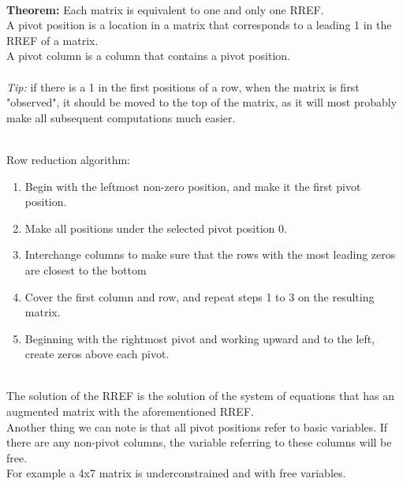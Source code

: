 \documentclass[nobib]{tufte-handout}
\begin{document}
\vspace{0.2cm}\\
\textbf{Theorem:} Each matrix is equivalent to one and only one RREF.\\
\quad A pivot position is a location in a matrix that corresponds to a leading 1 in the RREF of a matrix.\\
\quad A pivot column is a column that contains a pivot position.\\~\\
\textit{Tip:} if there is a 1 in the first positions of a row, when the matrix is first "observed", it should be moved to the top of the matrix, as it will most probably make all subsequent computations much easier. \\~\\
\begin{minipage}{\textwidth}
    Row reduction algorithm:
    \begin{enumerate}
        \item Begin with the leftmost non-zero position, and make it the first pivot
              position.
        \item Make all positions under the selected pivot position 0.
        \item Interchange columns to make sure that the rows with the most leading zeros are
              closest to the bottom
        \item Cover the first column and row, and repeat steps 1 to 3 on the resulting
              matrix.
        \item Beginning with the rightmost pivot and working upward and to the left, create
              zeros above each pivot.
    \end{enumerate}
\end{minipage}
\vspace{0.2cm}\\
The solution of the RREF is the solution of the system of equations that has an augmented matrix with the aforementioned RREF.\\
\quad Another thing we can note is that all pivot positions refer to basic variables. If there are any non-pivot columns, the variable referring to these columns will be free.\\
\quad For example a 4x7 matrix is underconstrained and with free variables. \\
\end{document}
